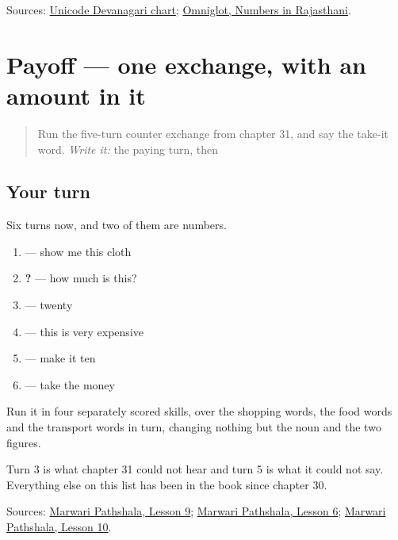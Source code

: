 \begin{tcolorbox}[breakable,colback=teal!4,colframe=teal!35!black,title={Before you move on}]
Sources: \href{https://www.unicode.org/charts/PDF/U0900.pdf}{Unicode Devanagari chart}; \href{https://www.omniglot.com/language/numbers/rajasthani.htm}{Omniglot, Numbers in Rajasthani}.
\end{tcolorbox}
\section[Practice]{Payoff — one exchange, with an amount in it}

\label{lesson:MW-C36-numbered-exchange}



\begin{quote}
Run the five-turn counter exchange from chapter 31, and say the take-it word. \emph{Write it:} the paying turn, then \textbf{}
\end{quote}

\subsection*{Your turn}
Six turns now, and two of them are numbers.

\begin{enumerate}
\raggedright
  \item \textbf{  } — show me this cloth
  \item \textbf{   ?} — how much is this?
  \item \textbf{} — twenty
  \item \textbf{   } — this is very expensive
  \item \textbf{ } — make it ten
  \item \textbf{  } — take the money
\end{enumerate}

Run it in four separately scored skills, over the shopping words, the food words and the transport words in turn, changing nothing but the noun and the two figures.

Turn 3 is what chapter 31 could not hear and turn 5 is what it could not say. Everything else on this list has been in the book since chapter 30.

\begin{tcolorbox}[breakable,colback=teal!4,colframe=teal!35!black,title={Before you move on}]
Sources: \href{https://www.marwaripathshala.com/marwari-lesson-9-english}{Marwari Pathshala, Lesson 9}; \href{https://www.marwaripathshala.com/marwari-lesson-6-english}{Marwari Pathshala, Lesson 6}; \href{https://www.marwaripathshala.com/marwari-lesson-10-english}{Marwari Pathshala, Lesson 10}.
\end{tcolorbox}
